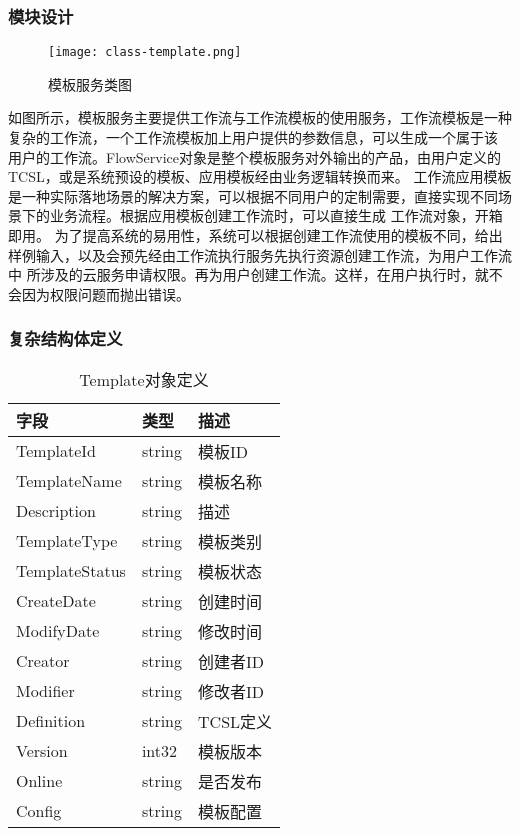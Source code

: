 \subsubsection{模块设计}



\begin{figure}[H]
    \centering
    \texttt{[image: class-template.png]}
    \caption{模板服务类图}
    \label{fig:模板服务类图}
\end{figure}
如图所示，模板服务主要提供工作流与工作流模板的使用服务，工作流模板是一种复杂的工作流，一个工作流模板加上用户提供的参数信息，可以生成一个属于该
用户的工作流。FlowService对象是整个模板服务对外输出的产品，由用户定义的TCSL，或是系统预设的模板、应用模板经由业务逻辑转换而来。
工作流应用模板是一种实际落地场景的解决方案，可以根据不同用户的定制需要，直接实现不同场景下的业务流程。根据应用模板创建工作流时，可以直接生成
工作流对象，开箱即用。
为了提高系统的易用性，系统可以根据创建工作流使用的模板不同，给出样例输入，以及会预先经由工作流执行服务先执行资源创建工作流，为用户工作流中
所涉及的云服务申请权限。再为用户创建工作流。这样，在用户执行时，就不会因为权限问题而抛出错误。




\subsubsection{复杂结构体定义}

\begin{table}[H]
    \centering
    \caption{Template对象定义}
    \label{tab:strcut-template}
    \begin{tabular}{lll}
        \toprule
        字段 & 类型 & 描述 \\
        \midrule
        TemplateId & string & 模板ID \\
        TemplateName &        string& 模板名称\\
        Description   &       string& 描述\\
        TemplateType     &    string& 模板类别\\
        TemplateStatus    &   string& 模板状态\\
        CreateDate        &   string& 创建时间\\
        ModifyDate        &   string& 修改时间\\
        Creator           &   string& 创建者ID\\
        Modifier          &   string& 修改者ID\\
        Definition        &   string& TCSL定义\\
        Version           &   int32& 模板版本\\
        Online            &   string& 是否发布\\
        Config            &   string& 模板配置\\
        \bottomrule
    \end{tabular}
\end{table}


